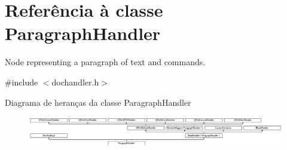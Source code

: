 \hypertarget{class_paragraph_handler}{\section{Referência à classe Paragraph\-Handler}
\label{class_paragraph_handler}
}


Node representing a paragraph of text and commands.  




{\ttfamily \#include $<$dochandler.\-h$>$}

Diagrama de heranças da classe Paragraph\-Handler\begin{figure}[H]
\begin{center}
\leavevmode
\includegraphics[height=1.350211cm]{class_paragraph_handler}
\end{center}
\end{figure}
